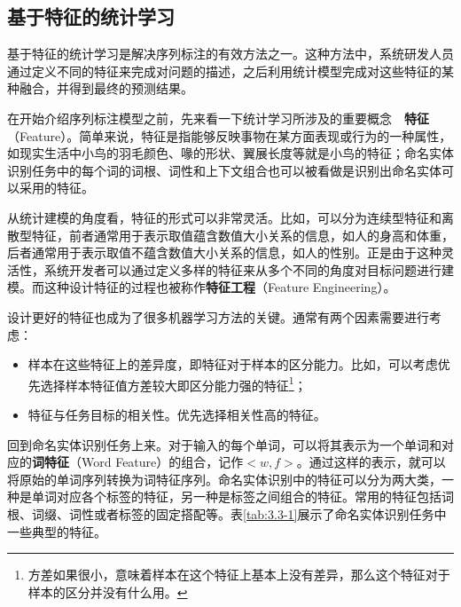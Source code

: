 
\subsection{基于特征的统计学习} \label{sec3:feature}

\parinterval 基于特征的统计学习是解决序列标注的有效方法之一。这种方法中，系统研发人员通过定义不同的特征来完成对问题的描述，之后利用统计模型完成对这些特征的某种融合，并得到最终的预测结果。

\parinterval 在开始介绍序列标注模型之前，先来看一下统计学习所涉及的重要概念\ \dash \ {\small\sffamily\bfseries{特征}}（Feature）。简单来说，特征是指能够反映事物在某方面表现或行为的一种属性，如现实生活中小鸟的羽毛颜色、喙的形状、翼展长度等就是小鸟的特征；命名实体识别任务中的每个词的词根、词性和上下文组合也可以被看做是识别出命名实体可以采用的特征。

\parinterval 从统计建模的角度看，特征的形式可以非常灵活。比如，可以分为连续型特征和离散型特征，前者通常用于表示取值蕴含数值大小关系的信息，如人的身高和体重，后者通常用于表示取值不蕴含数值大小关系的信息，如人的性别。正是由于这种灵活性，系统开发者可以通过定义多样的特征来从多个不同的角度对目标问题进行建模。而这种设计特征的过程也被称作{\small\sffamily\bfseries{特征工程}}（Feature Engineering）。

\parinterval 设计更好的特征也成为了很多机器学习方法的关键。通常有两个因素需要进行考虑：

\begin{itemize}
\vspace{0.5em}
\item 样本在这些特征上的差异度，即特征对于样本的区分能力。比如，可以考虑优先选择样本特征值方差较大即区分能力强的特征\footnote{方差如果很小，意味着样本在这个特征上基本上没有差异，那么这个特征对于样本的区分并没有什么用。}；
\vspace{0.5em}
\item 特征与任务目标的相关性。优先选择相关性高的特征。
\vspace{0.5em}
\end{itemize}

\parinterval 回到命名实体识别任务上来。对于输入的每个单词，可以将其表示为一个单词和对应的{\small\sffamily\bfseries{词特征}}（Word Feature）的组合，记作$<w, f>$。通过这样的表示，就可以将原始的单词序列转换为词特征序列。命名实体识别中的特征可以分为两大类，一种是单词对应各个标签的特征，另一种是标签之间组合的特征。常用的特征包括词根、词缀、词性或者标签的固定搭配等。表\ref{tab:3.3-1}展示了命名实体识别任务中一些典型的特征。

